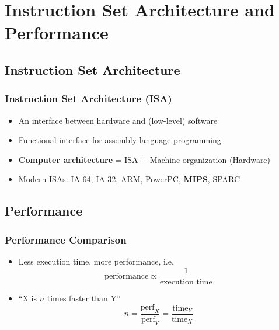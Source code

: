 \section{Instruction Set Architecture and Performance}

\subsection{Instruction Set Architecture}

\subsubsection*{Instruction Set Architecture (ISA)}
\begin{itemize}
    \item An interface between hardware and (low-level) software
    \item Functional interface for assembly-language programming
    \item \textbf{Computer architecture} = ISA + Machine organization (Hardware)
    \item Modern ISAs: IA-64, IA-32, ARM, PowerPC, \textbf{MIPS}, SPARC
\end{itemize}

\subsection{Performance}

\subsubsection*{Performance Comparison}
\begin{itemize}
    \item Less execution time, more performance, i.e.
    \begin{equation}
        \text{performance}\varpropto\frac{1}{\text{execution~time}}
    \end{equation}
    \item ``X is $n$ times faster than Y''
    \begin{equation}
        n=\frac{\text{perf}_X}{\text{perf}_Y}=\frac{\text{time}_Y}{\text{time}_X}
    \end{equation}
\end{itemize}

